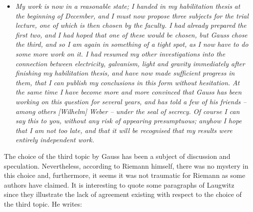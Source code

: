 \documentclass[12pt]{article}
\begin{document}
\begin{itemize}

\item[]{\it My work is now in a reasonable state; I handed in my habilitation thesis at the beginning of December, and I must now propose three subjects for the trial lecture, one of which is then chosen by the faculty. I had already prepared the first two, and I had hoped that one of these would be chosen, but Gauss chose the third, and so I am again in something of a tight spot, as I now have to do some more work on it. I had resumed my other investigations into the connection between electricity, galvanism, light and gravity immediately after finishing my habilitation thesis, and have now made sufficient progress in them, that I can publish my conclusions in this form without hesitation. At the same time I have become more and more convinced that Gauss has been working on this question for several years, and has told a few of his friends -- among others [Wilhelm] Weber -- under the seal of secrecy. Of course I can say this to you, without any risk of appearing presumptuous; anyhow I hope that I am not too late, and that it will be recognised that my results were entirely independent work.}

\end{itemize}

The choice of the third topic by Gauss has been a subject of discussion and speculation. Nevertheless, according to Riemann himself, there was no mystery in this choice and, furthermore, it seems it was not traumatic for Riemann as some authors have claimed. It is interesting to quote some paragraphs of Laugwitz \cite{Laugwitz1999} since they illustrate the lack of agreement existing with respect to the choice of the third topic. He writes:
\end{document}
